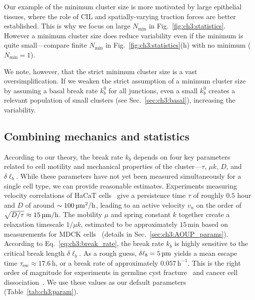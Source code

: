 Our example of the minimum cluster size is more motivated by large epithelial tissues, where the role of CIL and spatially-varying traction forces are better established. This is why we focus on large $N_\textrm{min}$ in Fig.~\ref{fig:ch3:statistics}. However a minimum cluster size does reduce variability even if the minimum is quite small---compare finite $N_\textrm{min}$ in Fig.~\ref{fig:ch3:statistics}(h) with no minimum ($N_\textrm{min} = 1$).

We note, however, that the strict minimum cluster size is a vast oversimplification. If we weaken the strict assumption of a minimum cluster size by assuming a basal break rate $k_b^0$ for all junctions, even a small $k_b^0$ creates a relevant population of small clusters (see Sec.~\ref{sec:ch3:basal}), increasing the variability.


\subsection{Combining mechanics and statistics}
\label{sec:ch3:combine}

According to our theory, the break rate $k_b$ depends on four key parameters related to cell motility and mechanical properties of the cluster---$\tau$, $\mu k$, $D$, and $\delta \ell_b$. While these parameters have not yet been measured simultaneously for a single cell type, we can provide reasonable estimates. Experiments measuring velocity correlations of HaCaT cells~\cite{selmeczi2005cell} give a persistence time $\tau$ of roughly $0.5$ hour and $D$ of around $\sim 100\,\textrm{\textmu}\mathrm{m^2/h}$, leading to an active velocity $v_n$ on the order of $\sqrt{D/\tau}\approx 15\,\textrm{\textmu}\mathrm{m/h}$. The mobility $\mu$ and spring constant $k$ together create a relaxation timescale $1/\mu k$, estimated to be approximately $15\,\mathrm{min}$ based on measurements for MDCK cells~\cite{jain2020role} (details in Sec.~\ref{sec:ch3:AOUP_params}). According to Eq.~\eqref{eq:ch3:break_rate}, the break rate $k_b$ is highly sensitive to the critical break length $\delta\ell_b$. As a rough guess, $\delta\ell_b=5\,\textrm{\textmu}\mathrm{m}$ yields a mean escape time $\tau_\mathrm{esc}\approx 17.6\,\mathrm{h}$, or a break rate of approximately $0.057\,\mathrm{h^{-1}}$. This is the right order of magnitude for experiments in germline cyst fracture~\cite{levy2024tug} and cancer cell dissociation~\cite{law2023cytokinesis,wang2025confinement}. We use these values as our default parameters (Table~\ref{tab:ch3:param}).

